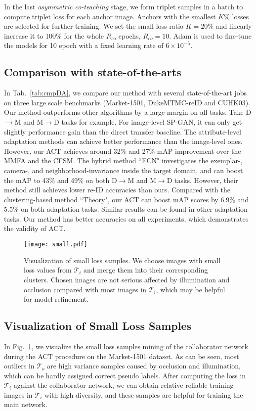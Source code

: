\documentclass[letterpaper]{article} \usepackage{aaai20}  \usepackage{times}  \usepackage{helvet} \usepackage{courier}  \usepackage[hyphens]{url}  \usepackage{graphicx} \urlstyle{rm} \def\UrlFont{\rm}  \usepackage{graphicx}  \frenchspacing  \setlength{\pdfpagewidth}{8.5in}  \setlength{\pdfpageheight}{11in}  \usepackage{color}
\begin{document}
In the last \textit{asymmetric co-teaching} stage, we form triplet samples in a batch to compute triplet loss for each anchor image. Anchors with the smallest $K$\% losses are selected for further training.  We set the small loss ratio $K=20\%$ and linearly increase it to 100\% for the whole $R_{co}$ epochs, $R_{co}=10$.
Adam is used to fine-tune the models for 10 epoch with a fixed learning rate of $6 \times 10^{-5}$.



\subsection{Comparison with state-of-the-arts} 

In Tab.~\ref{tab:cmpDA}, we compare our method with several state-of-the-art jobs on three large scale benchmarks (Market-1501, DukeMTMC-reID and CUHK03). Our method outperforms other algorithms by a large margin on all tasks. Take D$\rightarrow$M and M$\rightarrow$D tasks for example. For image-level SP-GAN, it can only get slightly performance gain than the direct transfer baseline. The attribute-level adaptation methods can achieve better performance than the image-level ones. However, our ACT achieves around 32\% and 27\% mAP improvement over the MMFA and the CFSM. The hybrid method ``ECN" investigates the exemplar-, camera-, and neighborhood-invariance inside the target domain, and can boost the mAP to 43\% and 49\% on both D$\rightarrow$M and M$\rightarrow$D tasks. However, their method still achieves lower re-ID accuracies than ours. Compared with the clustering-based method ``Theory", our ACT can boost mAP scores by 6.9\% and 5.5\% on both adaptation tasks. Similar results can be found in other adaptation tasks. Our method has better accuracies on all experiments, which demonstrates the validity of ACT.

\begin{figure}[!t]
  \centering
  \texttt{[image: small.pdf]}
  \caption{Visualization of small loss samples. We choose images with small loss values from $\mathcal{T}_{i}$ and merge them into their corresponding clusters. Chosen images are not serious affected by illumination and occlusion compared with most images in $\mathcal{T}_{i}$, which may be helpful for model refinement.}
  \label{fig:small}
\end{figure}

\subsection{Visualization of Small Loss Samples} 
In Fig.~\ref{fig:small}, we visualize the small loss samples mining of the collaborator network during the ACT procedure on the Market-1501 dataset. As can be seen, most outliers in $\mathcal{T}_{o}$ are high variance samples caused by occlusion and illumination, which can be hardly assigned correct pseudo labels. After computing the loss in $\mathcal{T}_{i}$ against the collaborator network, we can obtain relative reliable training images in $\mathcal{T}_{i}$ with high diversity, and these samples are helpful for training the main network. 
\end{document}
